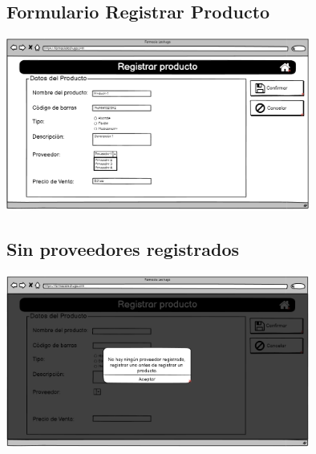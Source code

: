 \begin{flushleft}
	\subsection{Formulario Registrar Producto} \label{Formulario Registrar Producto}
	\begin{center}
		\includegraphics[width=10cm]{pantallas/images/27registrarproducto.PNG}\\	
		 	
	\end{center}
	\subsection{Sin proveedores registrados} \label{Sin proveedores registrados}
	\begin{center}
		\includegraphics[width=10cm]{pantallas/images/28sinproveedores.PNG}\\	
		 	
	\end{center}

\end{flushleft}
